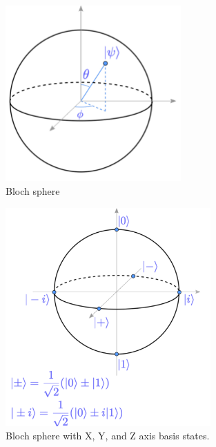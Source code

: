\begin{figure}[H]
    \centering
    \includegraphics[width=0.6\textwidth]{lesson2/bloch_sphere.pdf}
    
        \caption{Bloch sphere}
    
    \label{fig:bloch}
\end{figure}

\begin{figure}[H]
    \centering
    \includegraphics[width=0.7\textwidth]{lesson2/bloch_sphere_annotated.pdf}
    
        \caption{Bloch sphere with X, Y, and Z axis basis states.}
    
    \label{fig:annotated-bloch}
\end{figure}


